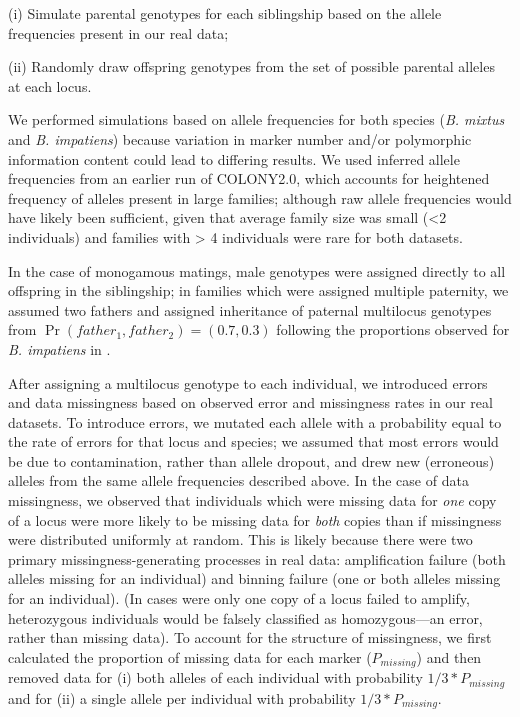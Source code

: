 \documentclass[12pt]{article}
\begin{document}
(i) Simulate parental genotypes for each siblingship based on the allele frequencies present in our real data;

(ii) Randomly draw offspring genotypes from the set of possible parental alleles at each locus.

We performed simulations based on allele frequencies for both species (\emph{B. mixtus} and \emph{B. impatiens}) because variation in marker number and/or polymorphic information content could lead to differing results. We used inferred allele frequencies from an earlier run of COLONY2.0, which accounts for heightened frequency of alleles present in large families; although raw allele frequencies would have likely been sufficient, given that average family size was small (<2 individuals) and families with > 4 individuals were rare for both datasets.

In the case of monogamous matings, male genotypes were assigned directly to all offspring in the siblingship; in families which were assigned multiple paternity, we assumed two fathers and assigned inheritance of paternal multilocus genotypes from $\Pr(father_1, father_2) = (0.7, 0.3)$ following the proportions observed for \emph{B. impatiens} in \textcite{birdMatingFrequencyEstimation2024}.

After assigning a multilocus genotype to each individual, we introduced errors and data missingness based on observed error and missingness rates in our real datasets. To introduce errors, we mutated each allele with a probability equal to the rate of errors for that locus and species; we assumed that most errors would be due to contamination, rather than allele dropout, and drew new (erroneous) alleles from the same allele frequencies described above. In the case of data missingness, we observed that individuals which were missing data for \emph{one} copy of a locus were more likely to be missing data for \emph{both} copies than if missingness were distributed uniformly at random. This is likely because there were two primary missingness-generating processes in real data: amplification failure (both alleles missing for an individual) and binning failure (one or both alleles missing for an individual). (In cases were only one copy of a locus failed to amplify, heterozygous individuals would be falsely classified as homozygous---an error, rather than missing data). To account for the structure of missingness, we first calculated the proportion of missing data for each marker ($P_{missing}$) and then removed data for (i) both alleles of each individual with probability $1/3 * P_{missing}$ and for (ii) a single allele per individual with probability $1/3 * P_{missing}$.
\end{document}
